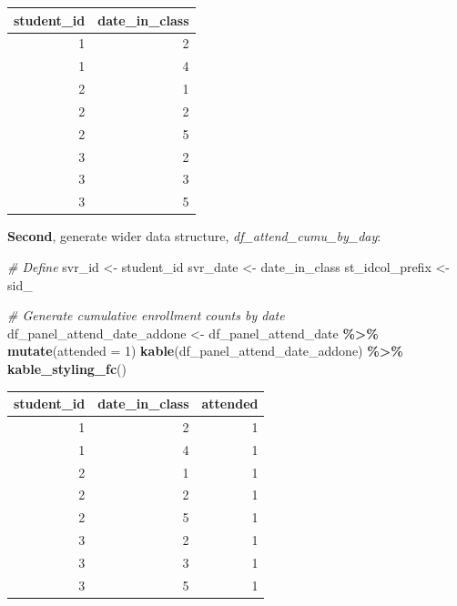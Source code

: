 \documentclass[
]{book}
\newenvironment{Shaded}{\begin{snugshade}}{\end{snugshade}}
\newcommand{\CommentTok}[1]{\textcolor[rgb]{0.56,0.35,0.01}{\textit{#1}}}
\newcommand{\DataTypeTok}[1]{\textcolor[rgb]{0.13,0.29,0.53}{#1}}
\newcommand{\DecValTok}[1]{\textcolor[rgb]{0.00,0.00,0.81}{#1}}
\newcommand{\KeywordTok}[1]{\textcolor[rgb]{0.13,0.29,0.53}{\textbf{#1}}}
\newcommand{\NormalTok}[1]{#1}
\newcommand{\OperatorTok}[1]{\textcolor[rgb]{0.81,0.36,0.00}{\textbf{#1}}}
\newcommand{\StringTok}[1]{\textcolor[rgb]{0.31,0.60,0.02}{#1}}
\begin{document}
\begin{table}[!h]
\centering
\begin{tabular}{r|r}
\hline
student\_id & date\_in\_class\\
\hline
\rowcolor{gray!6}  1 & 2\\
\hline
1 & 4\\
\hline
\rowcolor{gray!6}  2 & 1\\
\hline
2 & 2\\
\hline
\rowcolor{gray!6}  2 & 5\\
\hline
3 & 2\\
\hline
\rowcolor{gray!6}  3 & 3\\
\hline
3 & 5\\
\hline
\end{tabular}
\end{table}

\textbf{Second}, generate wider data structure, \emph{df\_attend\_cumu\_by\_day}:

\begin{Shaded}
\begin{Highlighting}[]
\CommentTok{\# Define}
\NormalTok{svr\_id \textless{}{-}}\StringTok{ \textquotesingle{}student\_id\textquotesingle{}}
\NormalTok{svr\_date \textless{}{-}}\StringTok{ \textquotesingle{}date\_in\_class\textquotesingle{}}
\NormalTok{st\_idcol\_prefix \textless{}{-}}\StringTok{ \textquotesingle{}sid\_\textquotesingle{}}

\CommentTok{\# Generate cumulative enrollment counts by date}
\NormalTok{df\_panel\_attend\_date\_addone \textless{}{-}}\StringTok{ }\NormalTok{df\_panel\_attend\_date }\OperatorTok{\%\textgreater{}\%}\StringTok{ }\KeywordTok{mutate}\NormalTok{(}\DataTypeTok{attended =} \DecValTok{1}\NormalTok{)}
\KeywordTok{kable}\NormalTok{(df\_panel\_attend\_date\_addone) }\OperatorTok{\%\textgreater{}\%}
\StringTok{  }\KeywordTok{kable\_styling\_fc}\NormalTok{()}
\end{Highlighting}
\end{Shaded}

\begin{table}[!h]
\centering
\begin{tabular}{r|r|r}
\hline
student\_id & date\_in\_class & attended\\
\hline
\rowcolor{gray!6}  1 & 2 & 1\\
\hline
1 & 4 & 1\\
\hline
\rowcolor{gray!6}  2 & 1 & 1\\
\hline
2 & 2 & 1\\
\hline
\rowcolor{gray!6}  2 & 5 & 1\\
\hline
3 & 2 & 1\\
\hline
\rowcolor{gray!6}  3 & 3 & 1\\
\hline
3 & 5 & 1\\
\hline
\end{tabular}
\end{table}
\end{document}
